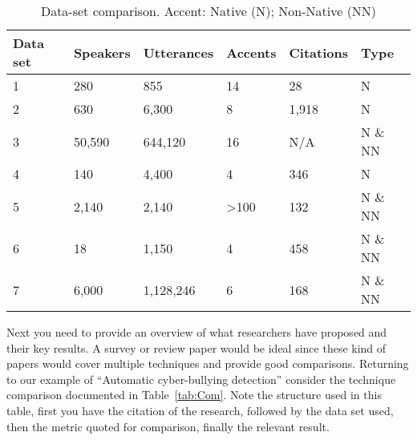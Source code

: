 \begin{table}[ht]
    \caption{Data-set comparison. Accent: Native (N); Non-Native (NN)}
    \label{tab:Data}
    \centering
    \begin{tabular}{l|l|l|l|l|l}
        \textbf{Data set} & \textbf{Speakers} & \textbf{Utterances} & \textbf{Accents}   & \textbf{Citations} & \textbf{Type} \\\hline
        1               & 280               & 855                 & 14                & 28              & N               \\
        2               & 630               & 6,300               & 8                 & 1,918           & N               \\
        3               & 50,590            & 644,120             & 16                & N/A             & N \& NN            \\
        4 & 140 & 4,400 & 4 & 346 & N \\
        5               & 2,140             & 2,140               & \textgreater{100} & 132             & N \& NN        \\
        6               & 18                & 1,150               & 4                 & 458             & N \& NN               \\
        7               & 6,000              & 1,128,246          & 6                 & 168             & N \& NN  
    \end{tabular}
\end{table}

\par Next you need to provide an overview of what researchers have proposed and their key results. A survey or review paper would be ideal since these kind of papers would cover multiple techniques and provide good comparisons. Returning to our example of \enquote{Automatic cyber-bullying detection} consider the technique comparison documented in Table~\ref{tab:Com}. Note the structure used in this table, first you have the citation of the research, followed by the data set used, then the metric quoted for comparison, finally the relevant result. 

